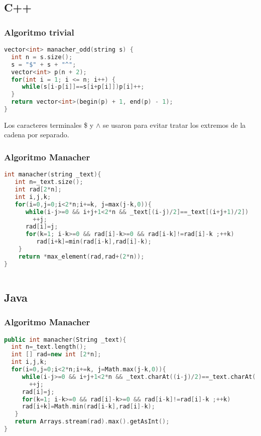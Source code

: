 \subsection{C++}

\subsubsection{Algoritmo trivial}
\begin{lstlisting}[language=C++]
vector<int> manacher_odd(string s) {
  int n = s.size();
  s = "$" + s + "^";
  vector<int> p(n + 2);
  for(int i = 1; i <= n; i++) {
     while(s[i-p[i]]==s[i+p[i]])p[i]++;
  }
  return vector<int>(begin(p) + 1, end(p) - 1);
}
\end{lstlisting} 

Los caracteres terminales \$ y $\wedge$ se usaron para evitar tratar los extremos de la cadena por separado.

\subsubsection{Algoritmo Manacher}

\begin{lstlisting}[language=C++]
int manacher(string _text){
   int n=_text.size();
   int rad[2*n];
   int i,j,k;
   for(i=0,j=0;i<2*n;i+=k, j=max(j-k,0)){
      while(i-j>=0 && i+j+1<2*n && _text[(i-j)/2]==_text[(i+j+1)/2])
        ++j;
      rad[i]=j;
      for(k=1; i-k>=0 && rad[i]-k>=0 && rad[i-k]!=rad[i]-k ;++k)
         rad[i+k]=min(rad[i-k],rad[i]-k);
    }
    return *max_element(rad,rad+(2*n));
}
	
\end{lstlisting}

\subsection{Java}
\subsubsection{Algoritmo Manacher}

\begin{lstlisting}[language=C++]
public int manacher(String _text){
  int n=_text.length();
  int [] rad=new int [2*n];
  int i,j,k;
  for(i=0,j=0;i<2*n;i+=k, j=Math.max(j-k,0)){
     while(i-j>=0 && i+j+1<2*n && _text.charAt((i-j)/2)==_text.charAt((i+j+1)/2))
       ++j;
     rad[i]=j;
     for(k=1; i-k>=0 && rad[i]-k>=0 && rad[i-k]!=rad[i]-k ;++k)
     rad[i+k]=Math.min(rad[i-k],rad[i]-k);
   }
   return Arrays.stream(rad).max().getAsInt(); 
}
	
\end{lstlisting}
